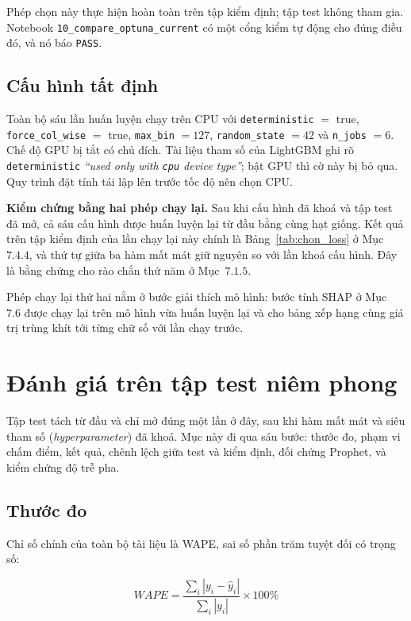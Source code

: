 \documentclass[12pt, a4paper]{report}
\begin{document}
Phép chọn này thực hiện hoàn toàn trên tập kiểm định; tập test không tham gia. Notebook
\texttt{10\_compare\_optuna\_current} có một cổng kiểm tự động cho đúng điều đó, và nó báo
\texttt{PASS}.

\FloatBarrier
\subsection{Cấu hình tất định}

Toàn bộ sáu lần huấn luyện chạy trên CPU với \texttt{deterministic} $=$ true,
\texttt{force\_col\_wise} $=$ true, \texttt{max\_bin} $=127$, \texttt{random\_state} $=42$ và
\texttt{n\_jobs} $=6$. Chế độ GPU bị tắt có chủ đích. Tài liệu tham số của LightGBM ghi rõ
\texttt{deterministic} \textit{``used only with \texttt{cpu} device type''}; bật GPU thì cờ này
bị bỏ qua. Quy trình đặt tính tái lập lên trước tốc độ nên chọn CPU.



\textbf{Kiểm chứng bằng hai phép chạy lại.} Sau khi cấu hình đã khoá và tập test đã mở, cả sáu
cấu hình được huấn luyện lại từ đầu bằng cùng hạt giống. Kết quả trên tập kiểm định của lần
chạy lại này chính là Bảng~\ref{tab:chon_loss} ở Mục~$7.4.4$, và thứ tự giữa ba hàm mất mát giữ
nguyên so với lần khoá cấu hình. Đây là bằng chứng cho rào chắn thứ năm ở Mục~$7.1.5$.

Phép chạy lại thứ hai nằm ở bước giải thích mô hình: bước tính SHAP ở Mục~$7.6$ được chạy lại
trên mô hình vừa huấn luyện lại và cho bảng xếp hạng cùng giá trị trùng khít tới từng chữ số
với lần chạy trước.

\FloatBarrier
\section{Đánh giá trên tập test niêm phong}

Tập test tách từ đầu và chỉ mở đúng một lần ở đây, sau khi hàm mất mát và siêu tham số
(\textit{hyperparameter}) đã khoá. Mục này đi qua sáu bước: thước đo, phạm vi chấm điểm, kết
quả, chênh lệch giữa test và kiểm định, đối chứng Prophet, và kiểm chứng độ trễ pha.

\FloatBarrier
\subsection{Thước đo}

Chỉ số chính của toàn bộ tài liệu là WAPE, sai số phần trăm tuyệt đối có trọng số:

\begin{equation}
WAPE = \frac{\sum_i \left| y_i - \hat{y}_i \right|}{\sum_i \left| y_i \right|} \times 100\%
\end{equation}
\end{document}
